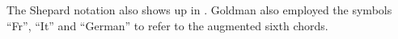 The Shepard notation also shows up in \textcite{goldman1965harmony}.
Goldman also employed the symbols ``Fr'', ``It'' and ``German'' to refer to the augmented sixth chords.




